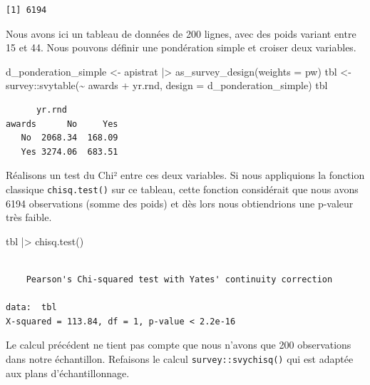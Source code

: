 \documentclass[
  letterpaper,
  DIV=11,
  numbers=noendperiod,
  oneside]{scrreprt}
\newenvironment{Shaded}{\begin{snugshade}}{\end{snugshade}}
\newcommand{\AttributeTok}[1]{\textcolor[rgb]{0.40,0.45,0.13}{#1}}
\newcommand{\FunctionTok}[1]{\textcolor[rgb]{0.28,0.35,0.67}{#1}}
\newcommand{\NormalTok}[1]{\textcolor[rgb]{0.00,0.23,0.31}{#1}}
\newcommand{\OtherTok}[1]{\textcolor[rgb]{0.00,0.23,0.31}{#1}}
\newcommand{\SpecialCharTok}[1]{\textcolor[rgb]{0.37,0.37,0.37}{#1}}
\begin{document}
\begin{verbatim}
[1] 6194
\end{verbatim}

Nous avons ici un tableau de données de 200 lignes, avec des poids
variant entre 15 et 44. Nous pouvons définir une pondération simple et
croiser deux variables.

\begin{Shaded}
\begin{Highlighting}[]
\NormalTok{d\_ponderation\_simple }\OtherTok{\textless{}{-}}\NormalTok{ apistrat }\SpecialCharTok{|\textgreater{}} 
  \FunctionTok{as\_survey\_design}\NormalTok{(}\AttributeTok{weights =}\NormalTok{ pw)}
\NormalTok{tbl }\OtherTok{\textless{}{-}}\NormalTok{ survey}\SpecialCharTok{::}\FunctionTok{svytable}\NormalTok{(}\SpecialCharTok{\textasciitilde{}}\NormalTok{ awards }\SpecialCharTok{+}\NormalTok{ yr.rnd, }\AttributeTok{design =}\NormalTok{ d\_ponderation\_simple)}
\NormalTok{tbl}
\end{Highlighting}
\end{Shaded}

\begin{verbatim}
      yr.rnd
awards      No     Yes
   No  2068.34  168.09
   Yes 3274.06  683.51
\end{verbatim}

Réalisons un test du Chi² entre ces deux variables. Si nous appliquions
la fonction classique \texttt{chisq.test()} sur ce tableau, cette
fonction considérait que nous avons 6194 observations (somme des poids)
et dès lors nous obtiendrions une p-valeur très faible.

\begin{Shaded}
\begin{Highlighting}[]
\NormalTok{tbl }\SpecialCharTok{|\textgreater{}} \FunctionTok{chisq.test}\NormalTok{()}
\end{Highlighting}
\end{Shaded}

\begin{verbatim}

    Pearson's Chi-squared test with Yates' continuity correction

data:  tbl
X-squared = 113.84, df = 1, p-value < 2.2e-16
\end{verbatim}

Le calcul précédent ne tient pas compte que nous n'avons que 200
observations dans notre échantillon. Refaisons le calcul
\texttt{survey::svychisq()} qui est adaptée aux plans d'échantillonnage.
\end{document}
